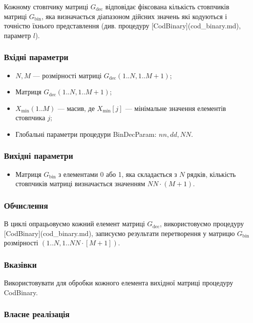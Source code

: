 \documentclass[a4paper, 12pt]{article}
\numberwithin{equation}{section}
\begin{document}
Кожному стовпчику матриці $G_{\text{dec}}$ відповідає фіксована кількість стовпчиків матриці $G_{\text{bin}}$, яка визначається діапазоном дійсних значень які кодуються і точністю їхнього представлення (див. процедуру [CodBinary](cod_binary.md), параметр $l$).

\subsubsection{Вхідні параметри}

\begin{itemize}
    \item $N, M$ --- розмірності матриці $G_{\text{dec}}(1..N,1..M+1)$;
    \item Матриця $G_{\text{dec}}(1..N,1..M+1)$;
    \item $X_{\text{min}}(1..M)$ --- масив, де $X_{\text{min}}[j]$ --- мінімальне значення елементів стовпчика $j$;
    \item Глобальні параметри процедури BinDecParam: $nn, dd, NN$.
\end{itemize}

\subsubsection{Вихідні параметри}

\begin{itemize}
    \item Матриця $G_{\text{bin}}$ з елементами 0 або 1, яка складається з $N$ рядків, кількість стовпчиків матриці визначається значенням $NN \cdot (M + 1)$.
\end{itemize}

\subsubsection{Обчислення}

В циклі опрацьовуємо кожний елемент матриці $G_{\text{dec}}$, використовуємо процедуру [CodBinary](cod_binary.md), записуємо результати перетворення у матрицю $G_{\text{bin}}$ розмірності $(1..N, 1..NN \cdot [M+1])$.

\subsubsection{Вказівки}

Використовувати для обробки кожного елемента вихідної матриці процедуру CodBinary.

\subsubsection{Власне реалізація}
\end{document}
